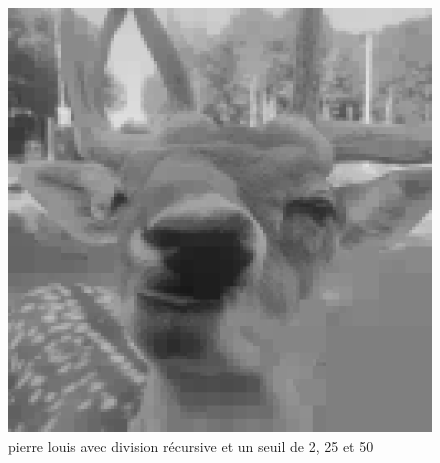 \documentclass{article}
\begin{document}
\begin{figure}[h]
\includegraphics[scale=0.4]{./pierrelouisdiviserecursiveseuil50.png}
\caption{pierre louis avec division récursive et un seuil de 2, 25 et 50}
\end{figure}

\newpage
\end{document}

